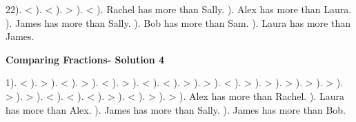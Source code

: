\documentclass{article}%
\begin{document}
22). <%
). <%
). >%
). <%
). Rachel has more than Sally.%
). Alex has more than Laura.%
). James has more than Sally.%
). Bob has more than Sam.%
). Laura has more than James.%
\newline%
\newpage%
\large%
\begin{center}%
\textbf{Comparing Fractions- Solution 4}%
\newline%
\end{center} \normalsize%
1). <%
). >%
). <%
). >%
). <%
). >%
). <%
). <%
). >%
). >%
). <%
). >%
). >%
). >%
). >%
). >%
). >%
). >%
). <%
). <%
). <%
). >%
). <%
). >%
). >%
). Alex has more than Rachel.%
). Laura has more than Alex.%
). James has more than Sally.%
). James has more than Bob.%
\newline%
\end{document}
